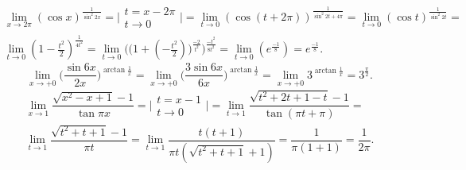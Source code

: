 \documentclass[12pt]{article}
\begin{document}
$$
\begin{array}{l}
\lim\limits_{x\rightarrow2\pi}(\cos{x})^\frac{1}{\sin^2{2x}} = 
\biggl|
\begin{array}{l}
t = x-2\pi \\ t\rightarrow0
\end{array}
\biggr| =
\lim\limits_{t\rightarrow0}(\cos{(t+2\pi)})^\frac{1}{\sin^2{2t+4\pi}} =
\lim\limits_{t\rightarrow0}(\cos{t})^\frac{1}{\sin^2{2t}} = \\
\lim\limits_{t\rightarrow0}(1-\frac{t^2}{2})^\frac{1}{4t^2} = 
\lim\limits_{t\rightarrow0}\biggl(\biggl(1+(-\frac{t^2}{2})\biggl)^\frac{-2}{t^2}\biggl)^\frac{-t^2}{8t^2} = \lim\limits_{t\rightarrow0}(e^\frac{-1}{8}) = e^\frac{-1}{8} .
\end{array}
$$
\newpage
$$
\lim\limits_{x\rightarrow+0}\biggl(\dfrac{\sin{6x}}{2x}\biggr)^{\arctan{\frac{1}{x}}} = 
\lim\limits_{x\rightarrow+0}\biggl(\dfrac{3\sin{6x}}{6x}\biggr)^{\arctan{\frac{1}{x}}} = \lim\limits_{x\rightarrow+0}3^{\arctan{\frac{1}{x}}} = 
3^\frac{\pi}{2} .
$$
$$
\begin{array}{l}
\lim\limits_{x\rightarrow1}\dfrac{\sqrt{x^2-x+1}-1}{\tan\pi x} = 
\biggl|
\begin{array}{l}
t = x - 1 \\ t\rightarrow0 
\end{array}
\biggr| =
\lim\limits_{t\rightarrow1}\dfrac{\sqrt{t^2+2t+1-t}-1}{\tan(\pi t+\pi)} = \\ \lim\limits_{t\rightarrow1}\dfrac{\sqrt{t^2+t+1}-1}{\pi t} = 
\lim\limits_{t\rightarrow1}\dfrac{t(t+1)}{\pi t(\sqrt{t^2+t+1}+1)} =
\dfrac{1}{\pi(1+1)} = \dfrac{1}{2\pi} .
\end{array}
$$
\end{document}
